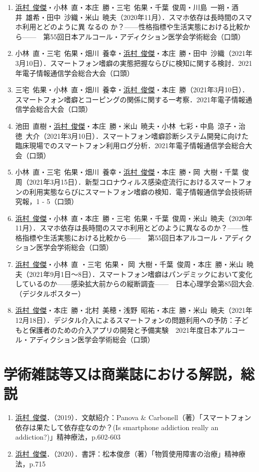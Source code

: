 \documentclass{article}
\begin{document}
\begin{enumerate}
	\item \underline{浜村\ 俊傑}・小林\ 直・本庄\ 勝・三宅\ 佑果・千葉\ 俊周・川島\ 一朔・酒井\ 雄希・田中\ 沙織・米山\ 暁夫（2020年11月）．スマホ依存は長時間のスマホ利用とどのように異	なるの	か？——性格指標や生活実態における比較から——　第55回日本アルコール・アディクション医学会学術総会（口頭）
	\item 小林\ 直・三宅\ 佑果・畑川\ 養幸・\underline{浜村\ 俊傑}・本庄\ 勝・田中\ 沙織（2021年3月10日）．スマートフォン嗜癖の実態把握ならびに検知に関する検討．2021年電子情報通信学会総合大会（口頭）
	\item 三宅\ 佑果・小林\ 直・畑川\ 養幸・\underline{浜村\ 俊傑}・本庄\ 勝（2021年3月10日）．スマートフォン嗜癖とコーピングの関係に関する一考察．2021年電子情報通信学会総合大会（口頭）
	\item 池田\ 直樹・\underline{浜村\ 俊傑}・本庄\ 勝・米山\ 暁夫・小林\ 七彩・中島\ 涼子・治徳\ 大介（2021年3月10日）．スマートフォン嗜癖診断システム開発に向けた臨床現場でのスマートフォン利用ログ分析．2021年電子情報通信学会総合大会（口頭）
	\item 小林\ 直・三宅\ 佑果・畑川\ 養幸・\underline{浜村\ 俊傑}・本庄\ 勝・岡\ 大樹・千葉\ 俊周（2021年3月15日）．新型コロナウィルス感染症流行におけるスマートフォンの利用実態ならびにスマートフォン嗜癖の検知．電子情報通信学会技術研究報，1 - 5（口頭）
	\item \underline{浜村\ 俊傑}・小林\ 直・本庄\ 勝・三宅\ 佑果・千葉\ 俊周・米山\ 暁夫（2020年11月）．スマホ依存は長時間のスマホ利用とどのように異なるのか？——性格指標や生活実態における比較から——　第55回日本アルコール・アディクション医学会学術総会（口頭）
	\item \underline{浜村\ 俊傑}・小林\ 直 ・三宅\ 佑果・ 岡\ 大樹・千葉\ 俊周・本庄\ 勝・米山\ 暁夫（2021年9月1日〜8日）．スマートフォン嗜癖はパンデミックにおいて変化しているのか——感染拡大前からの縦断調査——　日本心理学会第85回大会.（デジタルポスター）
	\item \underline{浜村\ 俊傑}・本庄\ 勝・北村\ 美穂・浅野\ 昭祐・本庄\ 勝・米山\ 暁夫（2021年12月18日）．デジタル介入によるスマートフォンの問題利用への予防：子どもと保護者のための介入アプリの開発と予備実験　2021年度日本アルコール・アディクション医学会学術総会（口頭）

\end{enumerate}

\section{学術雑誌等又は商業誌における解説，総説}
\begin{enumerate}
	\item \underline{浜村\ 俊傑}．（2019）．文献紹介：Panova \& Carbonell（著）「スマートフォン依存は果たして依存症なのか？(Is smartphone addiction really an addiction?)」精神療法，p.602-603
	\item \underline{浜村\ 俊傑}．（2020）．書評：松本俊彦（著）「物質使用障害の治療」精神療法，p.715
\end{enumerate}
\end{document}

